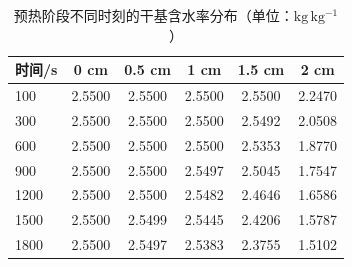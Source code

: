 \begin{table}[htbp]
\centering
\caption{预热阶段不同时刻的干基含水率分布（单位：$\mathrm{kg\,kg^{-1}}$）}
\label{tab:t2}
\begin{tabular}{lccccc}
\toprule
时间/s & 0 cm & 0.5 cm & 1 cm & 1.5 cm & 2 cm \\
\midrule
100 & 2.5500 & 2.5500 & 2.5500 & 2.5500 & 2.2470 \\
300 & 2.5500 & 2.5500 & 2.5500 & 2.5492 & 2.0508 \\
600 & 2.5500 & 2.5500 & 2.5500 & 2.5353 & 1.8770 \\
900 & 2.5500 & 2.5500 & 2.5497 & 2.5045 & 1.7547 \\
1200 & 2.5500 & 2.5500 & 2.5482 & 2.4646 & 1.6586 \\
1500 & 2.5500 & 2.5499 & 2.5445 & 2.4206 & 1.5787 \\
1800 & 2.5500 & 2.5497 & 2.5383 & 2.3755 & 1.5102 \\
\bottomrule
\end{tabular}
\end{table}
